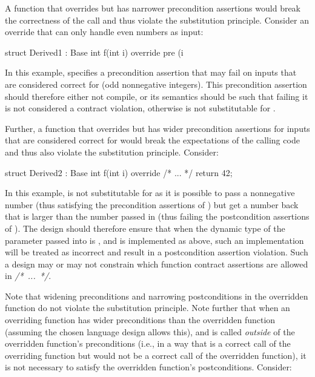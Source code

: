 A function that overrides  but has narrower precondition assertions would break the correctness of the call and thus violate the substitution principle. Consider an override that can only handle even numbers as input:
\begin{codeblock}
struct Derived1 : Base {
  int f(int i) override
    pre (i %
}
\end{codeblock}
In this example,  specifies a precondition assertion that may fail on inputs that are considered correct for  (odd nonnegative integers). This precondition assertion should therefore either not compile, or its semantics should be such that failing it is not considered a contract violation, otherwise  is not substitutable for .

Further, a function that overrides  but has wider precondition assertions for inputs that are considered correct for  would break the expectations of the calling code and thus also violate the substitution principle. Consider:

\begin{codeblock}
struct Derived2 : Base {
  int f(int i) override /* ... */ {
    return 42;
  }
}
\end{codeblock}

In this example,  is not substitutable for  as it is possible to pass a nonnegative number (thus satisfying the precondition assertions of ) but get a number back that is larger than the number passed in (thus failing the postcondition assertions of ). The design should therefore ensure that when the dynamic type of the parameter passed into   is , and  is implemented as above, such an implementation will be treated as incorrect and result in a postcondition assertion violation. Such a design may or may not constrain which function contract assertions are allowed in \mbox{\emph{/* ... */}}.


Note that widening preconditions and narrowing postconditions in the overridden function do not violate the substitution principle. Note further that when an overriding function has wider preconditions than the overridden function (assuming the chosen language design allows this), and is called \emph{outside} of the overridden function's preconditions (i.e., in a way that is a correct call of the overriding function but would not be a correct call of the overridden function), it is not necessary to satisfy the overridden function's postconditions. Consider:

